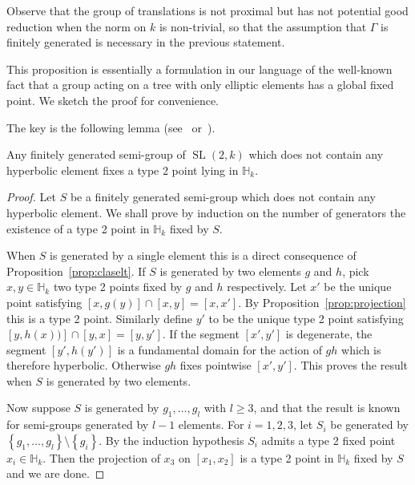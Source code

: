\documentclass[AHL,Unicode,longabstracts]{cedram}
\DeclareMathOperator{\SL}{SL}
\newcommand{\hh}{\mathbb{H}}
\newcommand{\set}[1]{\left\{#1\right\}}
\begin{document}
Observe that the group of translations is not proximal but has not potential good reduction when the norm on $k$ is non-trivial, so that the assumption that $\Gamma$ is finitely generated is necessary in the previous statement.


This proposition is essentially a formulation in our language of the well-known fact that a group acting on a tree with only elliptic elements has a global fixed point. We sketch the proof for convenience.

The key is the following lemma (see~\cite[Lem.~10.4]{kapovich} or~\cite[Lem.~40]{otal}).

\begin{lemm}\label{lem:semi group}
Any finitely generated semi-group of $\SL(2,k)$ which does not contain any hyperbolic element fixes a type 2 point lying in $\hh_k$.
\end{lemm}

\begin{proof}
Let $S$ be a finitely generated semi-group which does not contain any hyperbolic element. We shall prove by induction on the number of generators the existence of a type 2 point in $\hh_k$ fixed by $S$.

When $S$ is generated by a single element this is a direct consequence of Proposition~\ref{prop:claselt}. If $S$ is generated by two elements $g$ and $h$, pick $x,y\in \hh_k$ two type 2 points fixed by $g$ and $h$ respectively. Let $x'$ be the unique point satisfying $[x,g(y)] \cap [x,y] = [x,x']$. By Proposition~\ref{prop:projection} this is a type 2 point. Similarly define $y'$ to be the unique type 2 point satisfying $[y,h(x))] \cap [y,x] = [y,y']$. If the segment $[x',y']$ is degenerate, the segment $[y',h(y')]$ is a fundamental domain for the action of $gh$ which is therefore hyperbolic. Otherwise $gh$ fixes pointwise $[x',y']$. This proves the result when $S$ is generated by two elements.

Now suppose $S$ is generated by $g_1, \ldots, g_l$ with $l\ge 3$, and that the result is known for semi-groups generated by $l-1$ elements. For $i =1,2,3$, let $S_i$ be generated by $\set{ g_1, \ldots, g_l}\setminus \set{g_i}$. By the induction hypothesis $S_i$ admits a type 2 fixed point $x_i \in \hh_k$. Then the projection of $x_3$ on $[x_1, x_2]$ is a type 2 point in $\hh_k$ fixed by $S$ and we are done.
\end{proof}
\end{document}
